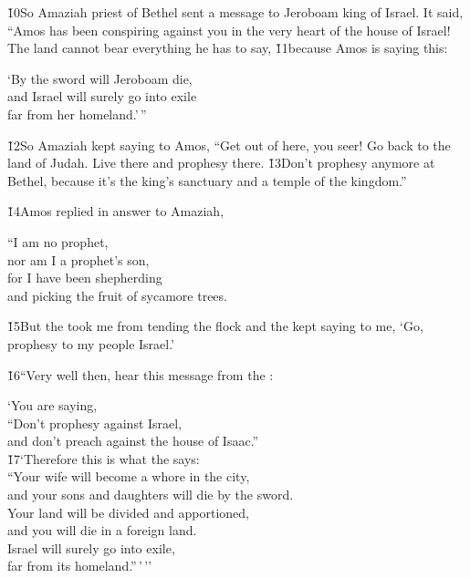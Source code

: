 \v{10}So Amaziah priest of Bethel sent a message to Jeroboam king of Israel. It said, ``Amos has been conspiring against you in the very heart of the house of Israel! The land cannot bear everything he has to say, \v{11}because Amos is saying this:

\begin{poetry}
\poeml `By the sword will Jeroboam die, \\
\poemll    and Israel will surely go into exile \\
\poemlll       far from her homeland.'\,''
\end{poetry}

\v{12}So Amaziah kept saying to Amos, ``Get out of here, you seer! Go back to the land of Judah. Live there and prophesy there. \v{13}Don't prophesy anymore at Bethel, because it's the king's sanctuary and a temple of the kingdom.''

\v{14}Amos replied in answer to Amaziah,

\begin{poetry}
\poeml ``I am no prophet, \\
\poemll    nor am I a prophet's son, \\
\poeml for I have been shepherding \\
\poemll    and picking the fruit of sycamore trees.
\end{poetry}

\v{15}But the  took me from tending the flock and the  kept saying to me, `Go, prophesy to my people Israel.'

\v{16}``Very well then, hear this message from the :

\begin{poetry}
\poeml `You are saying, \\
\poemll    ``Don't prophesy against Israel, \\
\poemlll       and don't preach against the house of Isaac.'' \\
\poeml \v{17}`Therefore this is what the  says: \\
\poemll    ``Your wife will become a whore in the city, \\
\poemlll       and your sons and daughters will die by the sword. \\
\poemll    Your land will be divided and apportioned, \\
\poemlll       and you will die in a foreign land. \\
\poemll    Israel will surely go into exile, \\
\poemlll       far from its homeland.''\,'\,''
\end{poetry}

